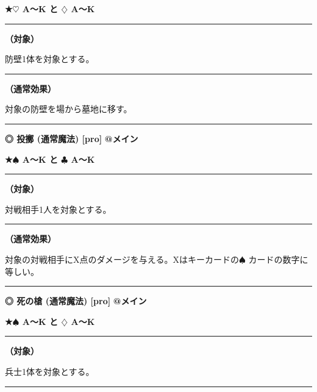 \documentclass[twocolumn,a5paper,papersize,10pt]{jarticle}
\begin{document}
{\footnotesize\bf ★{\normalsize $\heartsuit$} A〜K と {\normalsize $\diamondsuit$} A〜K}

\vspace{1mm}%
\hrule height 0.1mm depth 0mm width 66.5mm %
\vspace{1mm}%
{\bf（対象）}

防壁1体を対象とする。
\vspace{1mm}%
\hrule height 0.1mm depth 0mm width 66.5mm %
\vspace{1mm}%

{\bf（通常効果）}

対象の防壁を場から墓地に移す。
\vspace{2mm} %
\hrule height 0.5mm depth 0mm width 66.5mm %
\vspace{1mm} %
{\small\bf ◎ 投擲 {\scriptsize (通常魔法) [pro]}} %
\hfill 
{\footnotesize\bf @メイン }

{\footnotesize\bf ★{\normalsize $\spadesuit$} A〜K と {\normalsize $\clubsuit$} A〜K}

\vspace{1mm}%
\hrule height 0.1mm depth 0mm width 66.5mm %
\vspace{1mm}%
{\bf（対象）}

対戦相手1人を対象とする。
\vspace{1mm}%
\hrule height 0.1mm depth 0mm width 66.5mm %
\vspace{1mm}%

{\bf（通常効果）}

対象の対戦相手にX点のダメージを与える。Xはキーカードの{\normalsize $\spadesuit$} カードの数字に等しい。
\vspace{2mm} %
\hrule height 0.5mm depth 0mm width 66.5mm %
\vspace{1mm} %
{\small\bf ◎ 死の槍 {\scriptsize (通常魔法) [pro]}} %
\hfill 
{\footnotesize\bf @メイン }

{\footnotesize\bf ★{\normalsize $\spadesuit$} A〜K と {\normalsize $\diamondsuit$} A〜K}

\vspace{1mm}%
\hrule height 0.1mm depth 0mm width 66.5mm %
\vspace{1mm}%
{\bf（対象）}

兵士1体を対象とする。
\vspace{1mm}%
\hrule height 0.1mm depth 0mm width 66.5mm %
\vspace{1mm}%
\end{document}
